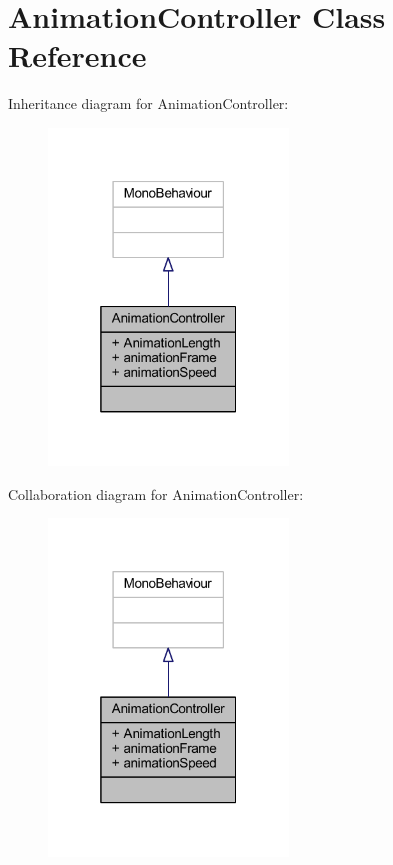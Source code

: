 \hypertarget{class_animation_controller}{}\section{Animation\+Controller Class Reference}
\label{class_animation_controller}


Inheritance diagram for Animation\+Controller\+:\nopagebreak
\begin{figure}[H]
\begin{center}
\leavevmode
\includegraphics[width=181pt]{class_animation_controller__inherit__graph}
\end{center}
\end{figure}


Collaboration diagram for Animation\+Controller\+:\nopagebreak
\begin{figure}[H]
\begin{center}
\leavevmode
\includegraphics[width=181pt]{class_animation_controller__coll__graph}
\end{center}
\end{figure}
